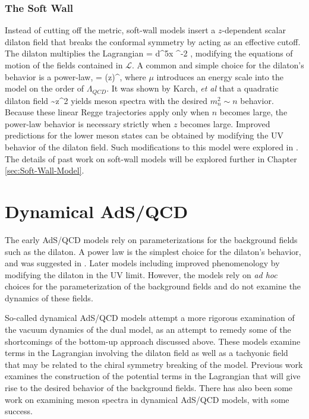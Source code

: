 \subsubsection{The Soft Wall}
Instead of cutting off the metric, soft-wall models insert a $z$-dependent scalar dilaton field that breaks the conformal symmetry by acting as an effective cutoff. 
The dilaton multiplies the Lagrangian
\be
{} = \int d^5x ^{-2\Phi} \root  {},
\ee
modifying the equations of motion of the fields contained in $\mathcal{L}$. 
A common and simple choice for the dilaton's behavior is a power-law,
\be
\Phi = (\mu z)^\nu,
\ee
where $\mu$ introduces an energy scale into the model on the order of $\Lambda_{QCD}$.
It was shown by Karch, \emph{et al} \cite{FILL-IN} that a quadratic dilaton field
\be
\Phi \sim z^2
\ee
yields meson spectra with the desired $m_n^2 \sim n$ behavior.
Because these linear Regge trajectories apply only when $n$ becomes large, the power-law behavior is necessary strictly when $z$ becomes large.
Improved predictions for the lower meson states can be obtained by modifying the UV behavior of the dilaton field.
Such modifications to this model were explored in \cite{FILL-IN}.
The details of past work on soft-wall models will be explored further in Chapter \ref{sec:Soft-Wall-Model}.

\section{Dynamical AdS/QCD}
The early AdS/QCD models rely on parameterizations for the background fields such as the dilaton.
A power law is the simplest choice for the dilaton's behavior, and was suggested in \cite{FILL-IN}.
Later models including \cite{FILL-IN} improved phenomenology by modifying the dilaton in the UV limit.
However, the models rely on \emph{ad hoc} choices for the parameterization of the background fields and do not examine the dynamics of these fields.

So-called dynamical AdS/QCD models attempt a more rigorous examination of the vacuum dynamics of the dual model, as an attempt to remedy some of the shortcomings of the bottom-up approach discussed above. 
These models examine terms in the Lagrangian involving the dilaton field as well as a tachyonic field that may be related to the chiral symmetry breaking of the model.
Previous work examines the construction of the potential terms in the Lagrangian that will give rise to the desired behavior of the background fields.
There has also been some work on examining meson spectra in dynamical AdS/QCD models, with some success.

